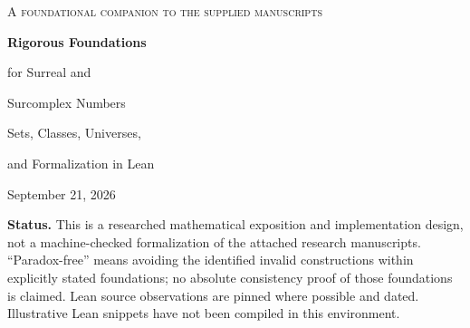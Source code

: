 \documentclass[11pt,letterpaper]{article}
\numberwithin{equation}{section}
\theoremstyle{definition}
\theoremstyle{remark}
\begin{document}
\hypersetup{pageanchor=false}
\begin{titlepage}
\centering
\vspace*{0.7cm}
{\large\scshape A foundational companion to the supplied manuscripts\par}
\vspace{1.0cm}
{\Huge\bfseries Rigorous Foundations\par for Surreal and\par Surcomplex Numbers\par}
\vspace{0.65cm}
{\LARGE Sets, Classes, Universes,\par and Formalization in Lean\par}
\vspace{0.8cm}
{\large September 21, 2026\par}
\vspace{0.8cm}
\begin{minipage}{0.94\textwidth}
\begin{abstract}
Surreal numbers are individually set-sized but collectively form a proper class in ordinary set theory. Their complexification inherits this size, without introducing a new algebraic paradox. The real foundational issues are the permitted sizes of cuts, the coding of quotients, the strength of recursion, the scope of support and function quantifiers, and the interpretation of topology. We compare definable-class constructions in ZF and ZFC, explicit classes in G\"odel--Bernays and von Neumann--Bernays--G\"odel theories, stronger Kelley--Morse theories, Grothendieck universes, bounded surreal fields, constructive set theories, predicative dependent type theory, and higher inductive-inductive approaches.

The three supplied manuscripts provide concrete test cases: set-sized Hahn workspaces, positive-support recursions, class-function replacement in Hartogs coherence, componentwise sheaves, and genuinely all-scale arguments. We give elementary proofs of the size obstructions and localization principles that distinguish these cases. A source-level audit of the current Lean ecosystem identifies existing surreal field and small-support Hahn infrastructure, separates it from unverified bridges, and proposes a modular implementation plan. The central discipline is to make \emph{smallness, algebraic closure, summability, and ambient topology separate hypotheses} rather than hiding them in the word ``surreal.''
\end{abstract}
\end{minipage}
\vfill
\begin{minipage}{0.94\textwidth}\small
\textbf{Status.} This is a researched mathematical exposition and implementation design, not a machine-checked formalization of the attached research manuscripts. ``Paradox-free'' means avoiding the identified invalid constructions within explicitly stated foundations; no absolute consistency proof of those foundations is claimed. Lean source observations are pinned where possible and dated. Illustrative Lean snippets have not been compiled in this environment.
\end{minipage}
\end{titlepage}
\end{document}
